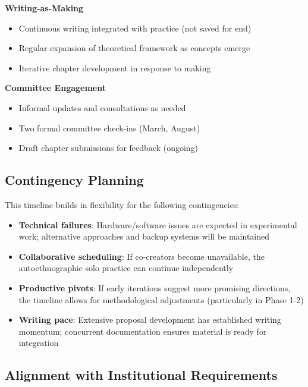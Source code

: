 \textbf{Writing-as-Making}
\begin{itemize}[noitemsep]
	\item Continuous writing integrated with practice (not saved for end)
	\item Regular expansion of theoretical framework as concepts emerge
	\item Iterative chapter development in response to making
\end{itemize}

\textbf{Committee Engagement}
\begin{itemize}[noitemsep]
	\item Informal updates and consultations as needed
	\item Two formal committee check-ins (March, August)
	\item Draft chapter submissions for feedback (ongoing)
\end{itemize}

\subsection*{Contingency Planning}

This timeline builds in flexibility for the following contingencies:

\begin{itemize}[noitemsep]
	\item \textbf{Technical failures}: Hardware/software issues are expected in experimental work; alternative approaches and backup systems will be maintained
	\item \textbf{Collaborative scheduling}: If co-creators become unavailable, the autoethnographic solo practice can continue independently
	\item \textbf{Productive pivots}: If early iterations suggest more promising directions, the timeline allows for methodological adjustments (particularly in Phase 1-2)
	\item \textbf{Writing pace}: Extensive proposal development has established writing momentum; concurrent documentation ensures material is ready for integration
\end{itemize}

\subsection*{Alignment with Institutional Requirements}

